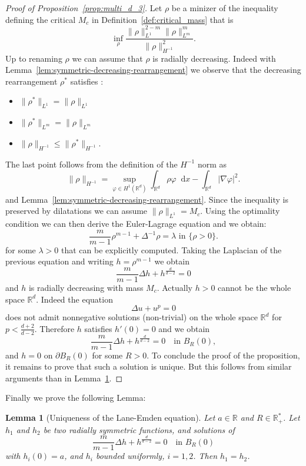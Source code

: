 \documentclass[11pt,a4paper]{article}
\numberwithin{equation}{section}
\newcommand{\R}{{\mathbb{R}}}
\theoremstyle{plain}
\newtheorem{lemma}[theorem]{Lemma}
\theoremstyle{remark}
\newcommand {\f}{\frac}
\newcommand{\diff}{\mathop{}\!\mathrm{d}}
\begin{document}
\begin{proof}[Proof of Proposition~\ref{prop:multi_d_3}]

Let $\rho$ be a minizer of the inequality defining the critical $M_c$ in Definition~\ref{def:critical_mass} that is
$$
\inf_{\rho}\f{\|\rho\|_{L^{1}}^{2-m}\|\rho\|_{L^{m}}^m}{\|\rho\|_{H^{-1}}^2}.
$$
Up to renaming $\rho$ we can assume that $\rho$ is radially decreasing. Indeed with Lemma~\ref{lem:symmetric-decreasing-rearrangement} we observe that the decreasing rearrangement $\rho^{*}$ satisfies :

\begin{itemize}
    \item $\|\rho^{*}\|_{L^{1}}= \|\rho\|_{L^{1}}$
    \item $\|\rho^{*}\|_{L^{m}}= \|\rho\|_{L^{m}}$
    \item $\|\rho\|_{H^{-1}}\le \|\rho^{*}\|_{H^{-1}}$.
\end{itemize}

The last point follows from the definition of the $H^{-1}$ norm as
$$
\|\rho\|_{H^{-1}}=\sup_{\varphi\in H^{1}(\R^d)}\int_{\R^d}\rho\varphi\diff x - \int_{\R^d}|\nabla\varphi|^2.
$$
and Lemma~\ref{lem:symmetric-decreasing-rearrangement}. Since the inequality is preserved by dilatations we can assume $\|\rho\|_{L^{1}}=M_{c}$. 
Using the optimality condition we can then derive the Euler-Lagrage equation and we obtain: 
$$
\f{m}{m-1}\rho^{m-1}+ \Delta^{-1}\rho=\lambda \text{ in $\{\rho>0\}$}.
$$
for some $\lambda>0$ that can be explicitly computed. 
  Taking the Laplacian of the previous equation and writing $h=\rho^{m-1}$ we obtain
$$
\f{m}{m-1}\Delta  h + h^{\f{d}{d-2}}=0 
 $$
and $h$ is radially decreasing with mass $M_{c}$. Actually $h>0$ cannot be the whole space $\R^d$. Indeed the equation
$$
\Delta u + u^{p}=0
$$
does not admit nonnegative solutions (non-trivial) on the whole space $\R^d$ for $p<\f{d+2}{d-2}.$  Therefore  $h$ satisfies $h'(0)=0$ and we obtain  
$$
\f{m}{m-1}\Delta  h + h^{\f{d}{d-2}}=0 \quad \text{in $B_{R}(0)$},
 $$
 and $h=0$ on $\partial B_{R}(0)$ for some $R>0$. To conclude the proof of the proposition, it remains to prove that such a solution is unique. But this follows from similar arguments than in Lemma~\ref{lem:uniqueness_lane_emden}.


 
\end{proof}


Finally we prove the following Lemma:
\begin{lemma}[Uniqueness of the Lane-Emden equation]\label{lem:uniqueness_lane_emden}
Let $a\in \R$ and $R\in \R_{+}^{*}$. Let $h_1$ and $h_2$ be two radially symmetric functions, and solutions of 
$$
\f{m}{m-1}\Delta h + h^{\f{d}{d-2}}=0\quad \text{in $B_{R}(0)$}
$$
with $h_{i}(0)=a$, and $h_i$ bounded uniformly, $i=1,2$. Then $h_1=h_2$.
\end{lemma}
\end{document}

